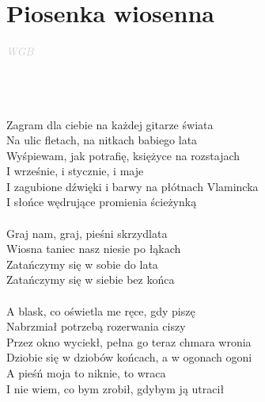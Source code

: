 \documentclass[a5paper, 10pt]{book}
\begin{document}
\section{Piosenka wiosenna}\textcolor{lightgray}{\textit{WGB}}\\~\\
\begin{minipage}[t]{0.8\textwidth}
  ~\\~\\
  Zagram dla ciebie na każdej gitarze świata\\
  Na ulic fletach, na nitkach babiego lata\\
  Wyśpiewam, jak potrafię, księżyce na rozstajach\\
  I wrześnie, i stycznie, i maje\\
  I zagubione dźwięki i barwy na płótnach Vlamincka\\
  I słońce wędrujące promienia ścieżynką\\
  \\
  \hspace*{5mm}Graj nam, graj, pieśni skrzydlata\\
  \hspace*{5mm}Wiosna taniec nasz niesie po łąkach\\
  \hspace*{5mm}Zatańczymy się w sobie do lata\\
  \hspace*{5mm}Zatańczymy się w siebie bez końca\\
  \\
  A blask, co oświetla me ręce, gdy piszę\\
  Nabrzmiał potrzebą rozerwania ciszy\\
  Przez okno wyciekł, pełna go teraz chmara wronia\\
  Dziobie się w dziobów końcach, a w ogonach ogoni\\
  A pieśń moja to niknie, to wraca\\
  I nie wiem, co bym zrobił, gdybym ją utracił\\
\end{minipage}
\end{document}

